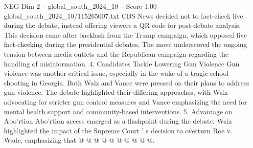 \begin{textsample}{NEG Dim 2 – global\_south\_2024\_10 – Score 1.00 – global\_south\_2024\_10/115265007.txt}
CBS News decided not to fact-check live during the debate, instead offering viewers a QR code for post-debate analysis.
This decision came after backlash from the Trump campaign, which opposed live fact-checking during the presidential debates.
The move underscored the ongoing tension between media outlets and the Republican campaign regarding the handling of misinformation. 4.
Candidates Tackle Lowering Gun Violence Gun violence was another critical issue, especially in the wake of a tragic school shooting in Georgia.
Both Walz and Vance were pressed on their plans to address gun violence.
The debate highlighted their differing approaches, with Walz advocating for stricter gun control measures and Vance emphasizing the need for mental health support and community-based interventions. 5.
Advantage on Abo'rtion Abo'rtion access emerged as a flashpoint during the debate.
Walz highlighted the impact of the Supreme Court ' s decision to overturn Roe v.
Wade, emphasizing that @ @ @ @ @ @ @ @ @ @.

\end{textsample}
